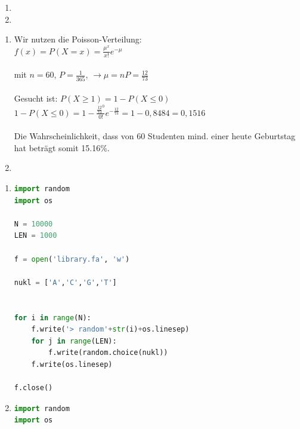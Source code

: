 \documentclass{homework}
\date{Montag, dem 19. November 2012}
\author{Stefan Meißner (4279113) und Niels Hoppe (4356370)}
\begin{document}
\maketitle
\begin{enumerate} 

\begin{enumerate}
\item

\item 
\end{enumerate}

\begin{enumerate}
\item
Wir nutzen die Poisson-Verteilung: \\
$f(x) = P(X=x) = \frac{\mu^x}{x!} e^{-\mu}$ \\ \\
mit $n = 60$, $P = \frac{1}{365}$, $\rightarrow \mu = nP = \frac{12}{73}$\\ \\
Gesucht ist: $P(X \geq 1) = 1 - P(X \leq 0)$ \\
$1-P(X \leq 0) = 1 - \frac{\frac{12}{73}^0}{0!} e^{-\frac{12}{73}} = 1 - 0,8484 = 0,1516$\\ \\
Die Wahrscheinlichkeit, dass von 60 Studenten mind. einer heute Geburtstag hat beträgt somit 15.16\%.
\item
\end{enumerate}


\begin{enumerate}
\item

\begin{lstlisting}[language=python]
import random
import os

N = 10000
LEN = 1000

f = open('library.fa', 'w')

nukl = ['A','C','G','T']


for i in range(N):
    f.write('> random'+str(i)+os.linesep)
    for j in range(LEN):
        f.write(random.choice(nukl))
    f.write(os.linesep)

f.close()
\end{lstlisting}

\item

\begin{lstlisting}[language=python]
import random
import os


\end{lstlisting}
\end{enumerate}
\end{enumerate}
\end{document}
